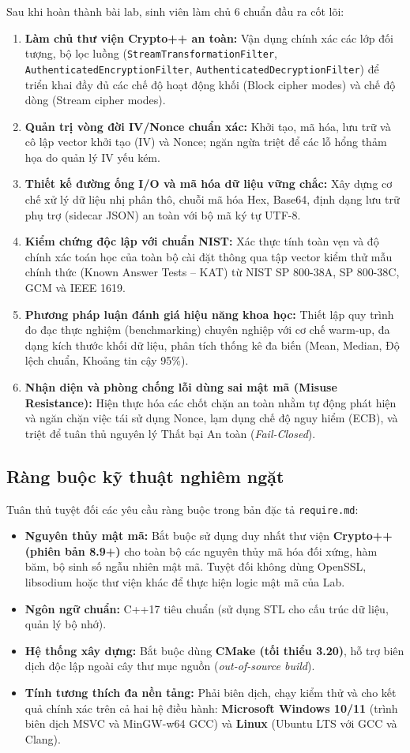 \documentclass[12pt, a4paper]{report}
\begin{document}
Sau khi hoàn thành bài lab, sinh viên làm chủ 6 chuẩn đầu ra cốt lõi:
\begin{enumerate}
    \item \textbf{Làm chủ thư viện Crypto++ an toàn:} Vận dụng chính xác các lớp đối tượng, bộ lọc luồng (\texttt{StreamTransformationFilter}, \texttt{AuthenticatedEncryptionFilter}, \texttt{AuthenticatedDecryptionFilter}) để triển khai đầy đủ các chế độ hoạt động khối (Block cipher modes) và chế độ dòng (Stream cipher modes).
    \item \textbf{Quản trị vòng đời IV/Nonce chuẩn xác:} Khởi tạo, mã hóa, lưu trữ và cô lập vector khởi tạo (IV) và Nonce; ngăn ngừa triệt để các lỗ hổng thảm họa do quản lý IV yếu kém.
    \item \textbf{Thiết kế đường ống I/O và mã hóa dữ liệu vững chắc:} Xây dựng cơ chế xử lý dữ liệu nhị phân thô, chuỗi mã hóa Hex, Base64, định dạng lưu trữ phụ trợ (sidecar JSON) an toàn với bộ mã ký tự UTF-8.
    \item \textbf{Kiểm chứng độc lập với chuẩn NIST:} Xác thực tính toàn vẹn và độ chính xác toán học của toàn bộ cài đặt thông qua tập vector kiểm thử mẫu chính thức (Known Answer Tests -- KAT) từ NIST SP 800-38A, SP 800-38C, GCM và IEEE 1619.
    \item \textbf{Phương pháp luận đánh giá hiệu năng khoa học:} Thiết lập quy trình đo đạc thực nghiệm (benchmarking) chuyên nghiệp với cơ chế warm-up, đa dạng kích thước khối dữ liệu, phân tích thống kê đa biến (Mean, Median, Độ lệch chuẩn, Khoảng tin cậy 95\%).
    \item \textbf{Nhận diện và phòng chống lỗi dùng sai mật mã (Misuse Resistance):} Hiện thực hóa các chốt chặn an toàn nhằm tự động phát hiện và ngăn chặn việc tái sử dụng Nonce, lạm dụng chế độ nguy hiểm (ECB), và triệt để tuân thủ nguyên lý Thất bại An toàn (\textit{Fail-Closed}).
\end{enumerate}

\subsection{Ràng buộc kỹ thuật nghiêm ngặt}
Tuân thủ tuyệt đối các yêu cầu ràng buộc trong bản đặc tả \texttt{require.md}:
\begin{itemize}
    \item \textbf{Nguyên thủy mật mã:} Bắt buộc sử dụng duy nhất thư viện \textbf{Crypto++ (phiên bản 8.9+)} cho toàn bộ các nguyên thủy mã hóa đối xứng, hàm băm, bộ sinh số ngẫu nhiên mật mã. Tuyệt đối không dùng OpenSSL, libsodium hoặc thư viện khác để thực hiện logic mật mã của Lab.
    \item \textbf{Ngôn ngữ chuẩn:} C++17 tiêu chuẩn (sử dụng STL cho cấu trúc dữ liệu, quản lý bộ nhớ).
    \item \textbf{Hệ thống xây dựng:} Bắt buộc dùng \textbf{CMake (tối thiểu 3.20)}, hỗ trợ biên dịch độc lập ngoài cây thư mục nguồn (\textit{out-of-source build}).
    \item \textbf{Tính tương thích đa nền tảng:} Phải biên dịch, chạy kiểm thử và cho kết quả chính xác trên cả hai hệ điều hành: \textbf{Microsoft Windows 10/11} (trình biên dịch MSVC và MinGW-w64 GCC) và \textbf{Linux} (Ubuntu LTS với GCC và Clang).
\end{itemize}
\end{document}
